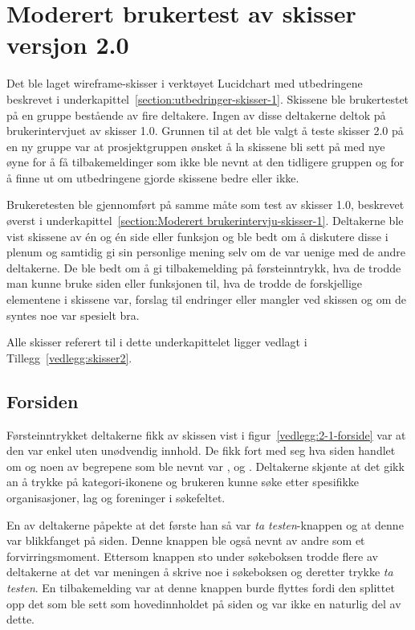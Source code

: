 \section{Moderert brukertest av skisser versjon 2.0}
\label{section:brukertest-skisser2.0}
 
Det ble laget wireframe-skisser i verktøyet Lucidchart med utbedringene beskrevet i underkapittel~\ref{section:utbedringer-skisser-1}. Skissene ble brukertestet på en gruppe bestående av fire deltakere. Ingen av disse deltakerne deltok på brukerintervjuet av skisser 1.0. Grunnen til at det ble valgt å teste skisser 2.0 på en ny gruppe var at prosjektgruppen ønsket å la skissene bli sett på med nye øyne for å få tilbakemeldinger som ikke ble nevnt at den tidligere gruppen og for å finne ut om utbedringene gjorde skissene bedre eller ikke.


Brukeretesten ble gjennomført på samme måte som test av skisser 1.0, beskrevet øverst i  underkapittel~\ref{section:Moderert brukerintervju-skisser-1}. Deltakerne ble vist skissene av én og én side eller funksjon og ble bedt om å diskutere disse i plenum og samtidig gi sin personlige mening selv om de var uenige med de andre deltakerne. De ble bedt om å gi tilbakemelding på førsteinntrykk, hva de trodde man kunne bruke siden eller funksjonen til, hva de trodde de forskjellige elementene i skissene var, forslag til endringer eller mangler ved skissen og om de syntes noe var spesielt bra.

Alle skisser referert til i dette underkapittelet ligger vedlagt i Tillegg~\ref{vedlegg:skisser2}.

\subsection{Forsiden}
\label{section:test-forside-2.0}

Førsteinntrykket deltakerne fikk av skissen vist i figur~\ref{vedlegg:2-1-forside} 
var at den var enkel uten unødvendig innhold. De fikk fort med seg hva siden handlet om og noen av begrepene som ble nevnt var ,  og . Deltakerne skjønte at det gikk an å trykke på kategori-ikonene og brukeren kunne søke etter spesifikke organisasjoner, lag og foreninger i søkefeltet.

En av deltakerne påpekte at det første han så var {\em ta testen}-knappen og at denne var blikkfanget på siden. Denne knappen ble også nevnt av andre som et forvirringsmoment. Ettersom knappen sto under søkeboksen trodde flere av deltakerne at det var meningen å skrive noe i søkeboksen og deretter trykke {\em ta testen}. En tilbakemelding var at denne knappen burde flyttes fordi den splittet opp det som ble sett som hovedinnholdet på siden og var ikke en naturlig del av dette.

